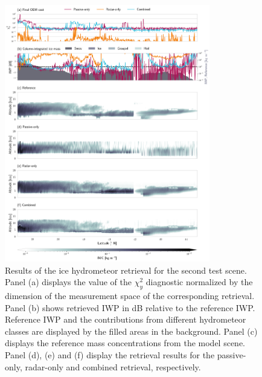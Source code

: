 \documentclass[journal abbreviation, manuscript]{copernicus}
\begin{document}
\clearpage

\begin{figure}
\centering
\includegraphics[width = 0.8\textwidth]{../plots/results_b_LargePlateAggregate}
\caption{Results of the ice hydrometeor retrieval for the second test scene.
  Panel (a) displays the value of the $\chi^2_y$ diagnostic normalized by the
  dimension of the measurement space of the corresponding retrieval. Panel (b)
  shows retrieved IWP in dB relative to the reference IWP. Reference IWP and the
  contributions from different hydrometeor classes are displayed by the filled
  areas in the background. Panel (c) displays the reference mass concentrations
  from the model scene. Panel (d), (e) and (f) display the retrieval results for
  the passive-only, radar-only and combined retrieval, respectively.}
\label{fig:results_b}
\end{figure}
\end{document}
